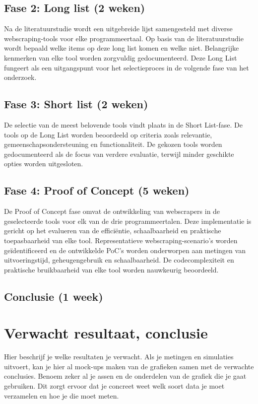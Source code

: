 \subsection{Fase 2: Long list (2 weken)}
Na de literatuurstudie wordt een uitgebreide lijst samengesteld met diverse webscraping-tools voor elke programmeertaal. 
Op basis van de literatuurstudie wordt bepaald welke items op deze long list komen en welke niet. Belangrijke kenmerken van elke tool 
worden zorgvuldig gedocumenteerd. Deze Long List fungeert als een uitgangspunt voor het selectieproces in de volgende fase 
van het onderzoek.

\subsection{Fase 3: Short list (2 weken)}
De selectie van de meest belovende tools vindt plaats in de Short List-fase. De tools op de Long List worden beoordeeld op 
criteria zoals relevantie, gemeenschapsondersteuning en functionaliteit. 
De gekozen tools worden gedocumenteerd als de focus van verdere evaluatie, terwijl minder geschikte opties 
worden uitgesloten.

\subsection{Fase 4: Proof of Concept (5 weken)}
De Proof of Concept fase omvat de ontwikkeling van webscrapers in de geselecteerde tools voor elk van de drie programmeertalen. 
Deze implementatie is gericht op het evalueren van de efficiëntie, schaalbaarheid en praktische toepasbaarheid van elke tool. 
Representatieve webscraping-scenario's worden geïdentificeerd en de ontwikkelde PoC's worden onderworpen aan metingen van 
uitvoeringstijd, geheugengebruik en schaalbaarheid. De codecomplexiteit en praktische bruikbaarheid van elke tool worden 
nauwkeurig beoordeeld.

\subsection{Conclusie (1 week)}

\section{Verwacht resultaat, conclusie}%
\label{sec:verwachte_resultaten}

Hier beschrijf je welke resultaten je verwacht. Als je metingen en simulaties uitvoert, kan je hier al mock-ups maken van de grafieken samen met de verwachte conclusies. Benoem zeker al je assen en de onderdelen van de grafiek die je gaat gebruiken. Dit zorgt ervoor dat je concreet weet welk soort data je moet verzamelen en hoe je die moet meten.

